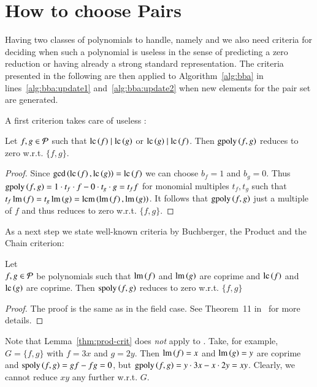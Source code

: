 \section{How to choose Pairs}
\label{sec:pairs}
Having two classes of polynomials to handle, namely \spts and \gpts we also need
criteria for deciding when such a polynomial is useless in the sense of
predicting a zero reduction or having already a strong standard representation.
The criteria presented in the following are then applied to
Algorithm~\ref{alg:bba} in lines~\ref{alg:bba:update1} and~\ref{alg:bba:update2}
when new elements for the pair set are generated.

A first criterion takes care of useless \gpts:

\begin{lemma}
Let $f,g \in \mathcal{P}$ such that $\mathrm{lc}\left({f}\right) \mid \mathrm{lc}\left({g}\right)$ or $\mathrm{lc}\left({g}\right) \mid \mathrm{lc}\left({f}\right)$. Then $\mathrm{gpoly}\left({f},{g}\right)$ reduces
to zero w.r.t. $\{f,g\}$.
\label{crit:gpoly-easy}
\end{lemma}

\begin{proof}
Since $\gcd\left(\mathrm{lc}\left({f}\right), \mathrm{lc}\left({g}\right)\right) = \mathrm{lc}\left({f}\right)$ we can choose $b_f = 1$ and $b_g
=0$. Thus $\mathrm{gpoly}\left({f},{g}\right) = 1 \cdot t_f \cdot f - 0 \cdot t_g \cdot g = t_f f$ for monomial
multiples $t_f, t_g$ such that $t_f \operatorname{lm}\left({f}\right) = t_g \operatorname{lm}\left({g}\right) = \operatorname{lcm}\left(\operatorname{lm}\left({f}\right), \operatorname{lm}\left({g}\right)\right)$. It follows that $\mathrm{gpoly}\left({f},{g}\right)$ just a multiple of $f$ and
thus reduces to zero w.r.t. $\{f,g\}$.
\end{proof}

As a next step we state well-known criteria by Buchberger, the Product and the
Chain criterion:

\begin{lemma}
Let\\
$f,g \in \mathcal{P}$ be polynomials such that $\operatorname{lm}\left({f}\right)$ and $\operatorname{lm}\left({g}\right)$ are coprime and $\mathrm{lc}\left({f}\right)$ and $\mathrm{lc}\left({g}\right)$ are coprime.
Then $\mathrm{spoly}\left({f},{g}\right)$ reduces to zero w.r.t. $\{f,g\}$
\label{thm:prod-crit}
\end{lemma}

\begin{proof}
The proof is the same as in the field case.
See Theorem~11 in~\cite{lichtblau2012} for more details.
\end{proof}

Note that Lemma~\ref{thm:prod-crit} does \emph{not} apply to \gpts. Take, for
example, $G=\{f,g\}$ with $f=3x$ and $g=2y$. Then $\operatorname{lm}\left({f}\right) = x$ and $\operatorname{lm}\left({g}\right) = y$
are coprime and $\mathrm{spoly}\left({f},{g}\right) = g f - fg = 0$, but $\mathrm{gpoly}\left({f},{g}\right) = y \cdot 3x - x
\cdot 2y = xy$. Clearly, we cannot reduce $xy$ any further w.r.t. $G$.

